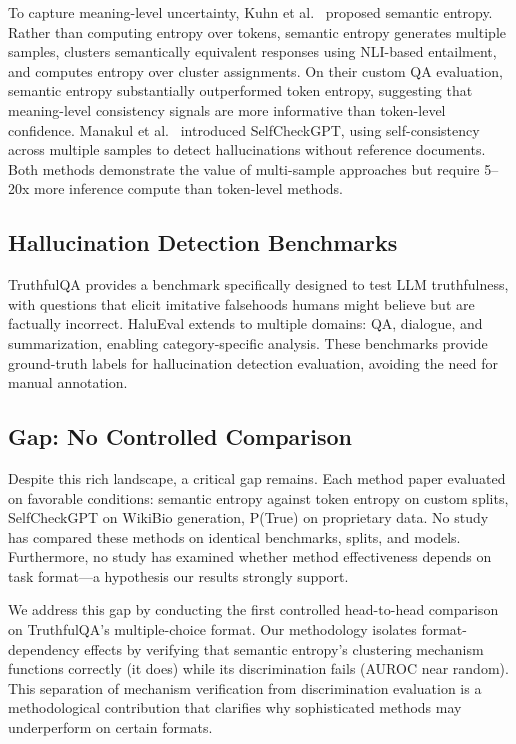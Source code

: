 To capture meaning-level uncertainty, Kuhn et al.\ \cite{kuhn2023semantic} proposed semantic entropy. Rather than computing entropy over tokens, semantic entropy generates multiple samples, clusters semantically equivalent responses using NLI-based entailment, and computes entropy over cluster assignments. On their custom QA evaluation, semantic entropy substantially outperformed token entropy, suggesting that meaning-level consistency signals are more informative than token-level confidence. Manakul et al.\ \cite{manakul2023selfcheckgpt} introduced SelfCheckGPT, using self-consistency across multiple samples to detect hallucinations without reference documents. Both methods demonstrate the value of multi-sample approaches but require 5--20x more inference compute than token-level methods.

\subsection{Hallucination Detection Benchmarks}

TruthfulQA \cite{lin2022truthfulqa} provides a benchmark specifically designed to test LLM truthfulness, with questions that elicit imitative falsehoods humans might believe but are factually incorrect. HaluEval \cite{li2023halueval} extends to multiple domains: QA, dialogue, and summarization, enabling category-specific analysis. These benchmarks provide ground-truth labels for hallucination detection evaluation, avoiding the need for manual annotation.

\subsection{Gap: No Controlled Comparison}

Despite this rich landscape, a critical gap remains. Each method paper evaluated on favorable conditions: semantic entropy against token entropy on custom splits, SelfCheckGPT on WikiBio generation, P(True) on proprietary data. No study has compared these methods on identical benchmarks, splits, and models. Furthermore, no study has examined whether method effectiveness depends on task format---a hypothesis our results strongly support.

We address this gap by conducting the first controlled head-to-head comparison on TruthfulQA's multiple-choice format. Our methodology isolates format-dependency effects by verifying that semantic entropy's clustering mechanism functions correctly (it does) while its discrimination fails (AUROC near random). This separation of mechanism verification from discrimination evaluation is a methodological contribution that clarifies why sophisticated methods may underperform on certain formats.
